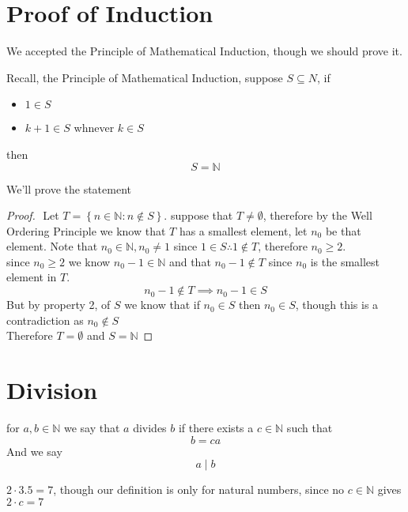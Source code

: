 \documentclass[11pt]{book}
\begin{document}
\section{Proof of Induction}%
\label{sec:proof_of_induction}

\begin{remark}
    We accepted the Principle of Mathematical Induction, though we should prove it.
\end{remark}

Recall, the Principle of Mathematical Induction, suppose $S \subseteq N$, if  
\begin{itemize}
    \item $1 \in S$ 
    \item $k + 1 \in S$ whnever $k\in S$ 
\end{itemize}
then 
\[
S= \mathbb{N} 
\]

We'll prove the statement
\begin{proof}
$ $\newline
    Let $T= \left\{ n\in \mathbb{N} : n \not\in S  \right\} $. suppose that $T\neq \emptyset $,  therefore by the Well Ordering Principle we know that $T$ has a smallest element, let $n_{0} $ be that element. Note that $n_{0} \in \mathbb{N}, n_{0} \neq 1 $ since $1\in S \therefore 1 \not\in T$, therefore $n_{0} \ge 2$.\\
    since $n_{0} \ge 2 $ we know $n_{0}  - 1 \in \mathbb{N} $ and that $n_{0}  - 1 \not\in T$ since $n_{0} $ is the smallest element in $T$. 
    \[
    n_{0}  - 1 \not\in T \implies n_{0}  - 1 \in S
    \]
    But by property 2, of $S$ we know that if $n_{0} \in S$ then $n_{0} \in S$,  though this is a contradiction as $n_{0} \not\in S$\\
    Therefore $T = \emptyset $ and $S = \mathbb{N} $ 
\end{proof}



\section{Division}%
\label{sec:division}

\begin{defn}[Divides]\label{defn:divides}
    for $a, b \in \mathbb{N} $ we say that $a$ divides $b$ if there exists a $c \in \mathbb{N} $ such that 
    \[
    b= ca
    \]
    And we say 
    \[
    a \mid b
    \]
\end{defn}
\begin{remark}
    $2 \cdot 3.5 = 7$, though our definition is only for natural numbers, since no $c \in \mathbb{N} $ gives $2 \cdot c = 7$ 
\end{remark}
\end{document}
